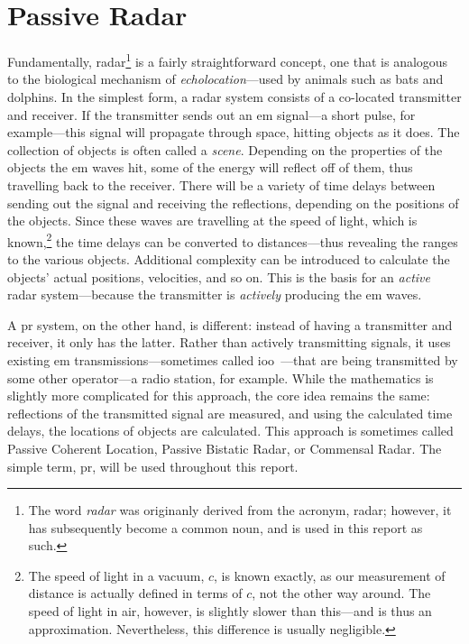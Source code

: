 \documentclass[class=report,11pt,crop=false]{standalone}
\begin{document}
\section{Passive Radar}
Fundamentally, radar\footnote{The word \emph{radar} was originanly derived from the acronym, \acrlong{radar}; however, it has subsequently become a common noun, and is used in this report as such.} is a fairly straightforward concept, one that is analogous to the biological mechanism of \emph{echolocation}---used by animals such as bats and dolphins. In the simplest form, a radar system consists of a co-located transmitter and receiver. If the transmitter sends out an \gls{em} signal---a short pulse, for example---this signal will propagate through space, hitting objects as it does. The collection of objects is often called a \emph{scene}. Depending on the properties of the objects the \gls{em} waves hit, some of the energy will reflect off of them, thus travelling back to the receiver. There will be a variety of time delays between sending out the signal and receiving the reflections, depending on the positions of the objects. Since these waves are travelling at the speed of light, which is known,\footnote{The speed of light in a vacuum, \(c\), is known exactly, as our measurement of distance is actually defined in terms of \(c\), not the other way around. The speed of light in air, however, is slightly slower than this---and is thus an approximation. Nevertheless, this difference is usually negligible.} the time delays can be converted to distances---thus revealing the ranges to the various objects. Additional complexity can be introduced to calculate the objects' actual positions, velocities, and so on. This is the basis for an \emph{active} radar system---because the transmitter is \emph{actively} producing the \gls{em} waves.

A \gls{pr} system, on the other hand, is different: instead of having a transmitter and receiver, it only has the latter. Rather than actively transmitting signals, it uses existing \gls{em} transmissions---sometimes called \gls{ioo}~\cite{Griffiths1992}---that are being transmitted by some other operator---a radio station, for example. While the mathematics is slightly more complicated for this approach, the core idea remains the same: reflections of the transmitted signal are measured, and using the calculated time delays, the locations of objects are calculated. This approach is sometimes called Passive Coherent Location, Passive Bistatic Radar, or Commensal Radar. The simple term, \gls{pr}, will be used throughout this report.
\end{document}
